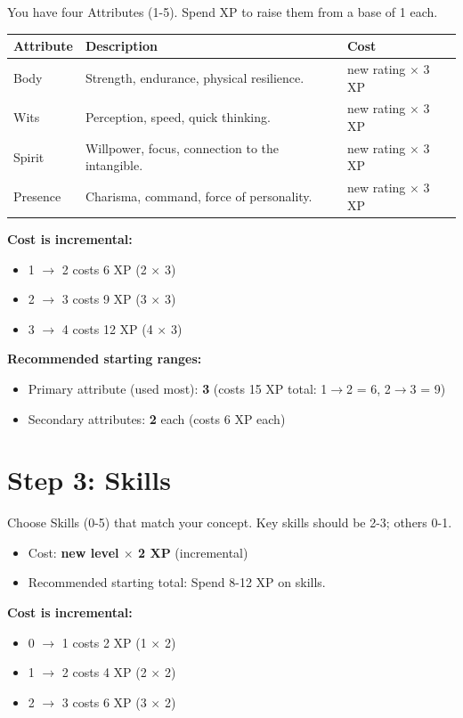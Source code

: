 \documentclass[11pt]{book}
\begin{document}
You have four Attributes (1-5). Spend XP to raise them from a base of 1 each.

\begin{center}
\begin{tabular}{lll}
\toprule
\textbf{Attribute} & \textbf{Description} & \textbf{Cost} \\
\midrule
Body & Strength, endurance, physical resilience. & new rating $\times$ 3 XP \\
Wits & Perception, speed, quick thinking. & new rating $\times$ 3 XP \\
Spirit & Willpower, focus, connection to the intangible. & new rating $\times$ 3 XP \\
Presence & Charisma, command, force of personality. & new rating $\times$ 3 XP \\
\bottomrule
\end{tabular}
\end{center}

\textbf{Cost is incremental:}
\begin{itemize}
  \item 1 $\to$ 2 costs 6 XP (2 $\times$ 3)
  \item 2 $\to$ 3 costs 9 XP (3 $\times$ 3)
  \item 3 $\to$ 4 costs 12 XP (4 $\times$ 3)
\end{itemize}

\textbf{Recommended starting ranges:}
\begin{itemize}
  \item Primary attribute (used most): \textbf{3} (costs 15 XP total: 1$\to$2 = 6, 2$\to$3 = 9)
  \item Secondary attributes: \textbf{2} each (costs 6 XP each)
\end{itemize}

\section{Step 3: Skills}

Choose Skills (0-5) that match your concept. Key skills should be 2-3; others 0-1.

\begin{itemize}
  \item Cost: \textbf{new level $\times$ 2 XP} (incremental)
  \item Recommended starting total: Spend 8-12 XP on skills.
\end{itemize}

\textbf{Cost is incremental:}
\begin{itemize}
  \item 0 $\to$ 1 costs 2 XP (1 $\times$ 2)
  \item 1 $\to$ 2 costs 4 XP (2 $\times$ 2)
  \item 2 $\to$ 3 costs 6 XP (3 $\times$ 2)
\end{itemize}
\end{document}
